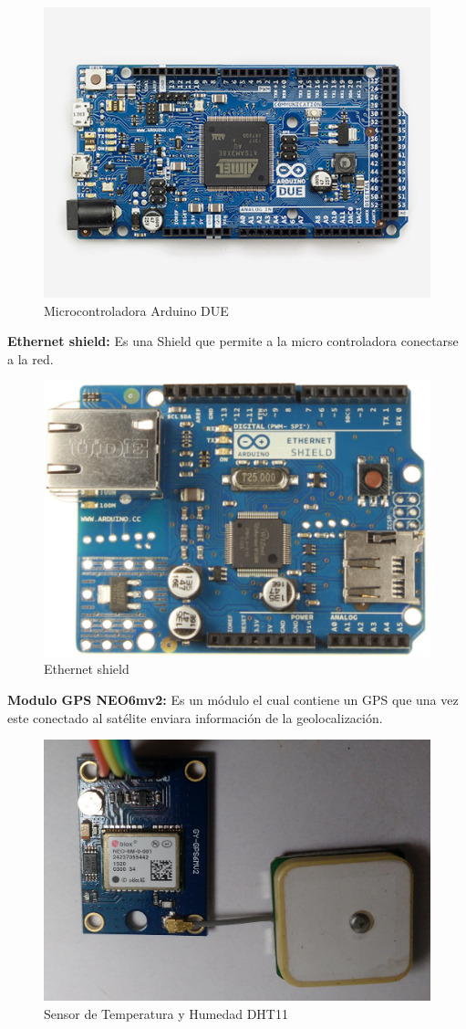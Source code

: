 \begin{figure}[!h]
	\centering
	\includegraphics[width=0.5\linewidth]{figuras/arddue}
	\caption{Microcontroladora Arduino DUE \cite{Arduino}}
	\label{fig:imgdue}
\end{figure}

\setlength{\parindent}{0ex}\textbf{Ethernet shield:} Es una Shield que permite a la micro controladora conectarse a la red.

\begin{figure}[!h]
	\centering
	\includegraphics[width=0.4\linewidth]{figuras/ethshi}
	\caption{Ethernet shield \cite{Arduino}}
	\label{fig:imgethshi}
\end{figure}

\setlength{\parindent}{0ex}\textbf{Modulo GPS NEO6mv2: }Es un módulo el cual contiene un GPS que una vez este conectado al satélite enviara información de la geolocalización.

	\begin{figure}[!h]
		\centering
		\includegraphics[width=0.6\linewidth]{figuras/neo6mv2}
		\caption{Sensor de Temperatura y Humedad DHT11}
		\label{fig:dht11}
	\end{figure}


